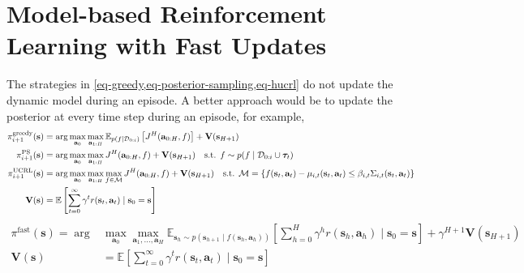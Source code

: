 \documentclass{article}
\newcommand{\state}{\ensuremath{\mathbf{s}}}
\newcommand{\action}{\ensuremath{\mathbf{a}}}
\newcommand{\discount}{\ensuremath{\gamma}}
\newcommand{\dataset}{\ensuremath{\mathcal{D}}}
\newcommand{\horizon}{\ensuremath{h}}
\newcommand{\Horizon}{\ensuremath{H}}
\newcommand{\rewardFn}{\ensuremath{r}}
\newcommand{\transitionFn}{\ensuremath{f}}
\newcommand{\stateValueFn}{\ensuremath{\mathbf{V}}}
\newcommand{\policy}{\ensuremath{\pi}}
\begin{document}
\section{Model-based Reinforcement Learning with Fast Updates}
The strategies in \cref{eq-greedy,eq-posterior-sampling,eq-hucrl} do not update the dynamic model during an episode.
A better approach would be to update the posterior at every time step during an episode, for example,
\begin{subequations}
\begin{align} \label{eq-fast-update-mpc}
  \policy_{i+1}^{\text{greedy}}(\state) &= \arg \max_{\action_{0}} \max_{\action_{1:\Horizon}}
\E_{p(\transitionFn \mid \dataset_{0:i})} \left[J^{\Horizon}(\action_{0:\Horizon}, \transitionFn) \right] + \stateValueFn(\state_{\Horizon+1}) \\
  \policy_{i+1}^{\text{PS}}(\state) &= \arg \max_{\action_{0}} \max_{\action_{1:\Horizon}}
J^{\Horizon}(\action_{0:\Horizon}, \transitionFn) + \stateValueFn(\state_{\Horizon+1}) \quad \text{s.t. } \transitionFn \sim p(\transitionFn \mid \dataset_{0:i} \cup \bm\tau_{t}) \\
  \policy_{i+1}^{\text{UCRL}}(\state) &= \arg \max_{\action_{0}} \max_{\action_{1:\Horizon}} \max_{\transitionFn \in \mathcal{M}}
J^{\Horizon}(\action_{0:\Horizon}, \transitionFn) + \stateValueFn(\state_{\Horizon+1}) \quad \text{s.t. } \mathcal{M} = \{\transitionFn(\state_{t},\action_{t}) - \mu_{i,t}(\state_{t},\action_{t}) \leq \beta_{i,t} \Sigma_{i,t}(\state_{t}, \action_{t})\} \\
  \stateValueFn(\state) &= \mathbb{E} \left[ \sum_{t=0}^{\infty}     \discount^{t} \rewardFn(\state_{t},\action_{t}) \mid \state_{0}=\state \right] \label{eq-value-fn}
\end{align}
\end{subequations}
\begin{subequations}
\begin{align} \label{eq-fast-update-mpc-old}
  \policy^{\text{fast}}(\state) = \arg &\max_{\action_{0}} \max_{\action_{1}, \ldots, \action_{\Horizon}}
  \mathbb{E}_{\state_{\horizon} \sim p(\state_{\horizon+1} \mid \transitionFn(\state_{\horizon}, \action_{\horizon}))} \left[ \sum_{\horizon=0}^{\Horizon}     \discount^{\horizon} \rewardFn(\state_{\horizon},\action_{\horizon}) \mid \state_{0}=\state \right] + \discount^{\Horizon+1} \stateValueFn(\state_{\Horizon+1}) \\
  \stateValueFn(\state) &= \mathbb{E} \left[ \sum_{t=0}^{\infty}     \discount^{t} \rewardFn(\state_{t},\action_{t}) \mid \state_{0}=\state \right] \label{eq-fast-update-mpc}
\end{align}
\end{subequations}
\end{document}

